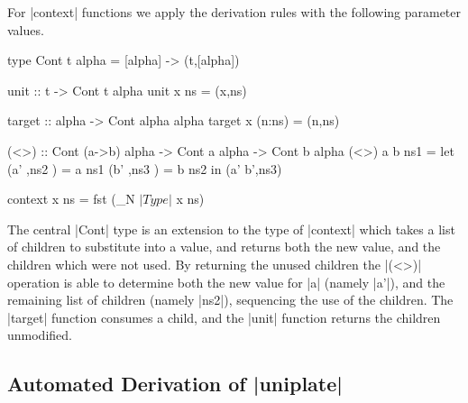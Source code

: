 For |context| functions we apply the derivation rules with the following parameter values.

\begin{code}
type Cont t alpha = [alpha] -> (t,[alpha])

unit :: t -> Cont t alpha
unit x ns = (x,ns)

target :: alpha -> Cont alpha alpha
target x (n:ns) = (n,ns)

(<>) :: Cont (a->b) alpha -> Cont a alpha -> Cont b alpha
(<>) a b ns1 =  let  (a'  ,ns2  ) = a  ns1
                     (b'  ,ns3  ) = b  ns2
                in   (a' b',ns3)

context x ns = fst (_N $| Type |$ \? x ns)
\end{code}

The central |Cont| type is an extension to the type of |context| which takes a list of children to substitute into a value, and returns both the new value, and the children which were not used. By returning the unused children the |(<>)| operation is able to determine both the new value for |a| (namely |a'|), and the remaining list of children (namely |ns2|), sequencing the use of the children. The |target| function consumes a child, and the |unit| function returns the children unmodified.

\begin{comment}
It is possible to improve the simplification opportunities and runtime speed by moving to continuation passing.
, by redefining if we use a continuation function to encode the pair.

\begin{code}
setChildren x ns = dExpr x ns const

type Cont t alpha r = [alpha] -> (t -> [alpha] -> r) -> r

unit :: t -> Cont t alpha r
unit    x  ns      c  = c x ns

target :: alpha -> Cont alpha alpha r
target  x  (n:ns)  c  = c n ns

(<>) :: Cont (a->b) alpha r -> Cont a alpha r -> Cont b alpha r
(<>) a b ns c =  a  ns $ \a'  ns ->
                 b  ns $ \b'  ns ->
                 c (a' b') ns
\end{code}
\end{comment}

\subsection{Automated Derivation of |uniplate|}

